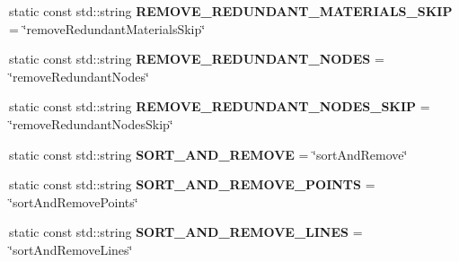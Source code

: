 \begin{DoxyCompactItemize}
\item 
\hypertarget{classrepo_1_1manipulator_1_1modelconvertor_1_1_model_import_config_a003b6e0a8d481f1306fc6880129f48cb}{}static const std\+::string {\bfseries R\+E\+M\+O\+V\+E\+\_\+\+R\+E\+D\+U\+N\+D\+A\+N\+T\+\_\+\+M\+A\+T\+E\+R\+I\+A\+L\+S\+\_\+\+S\+K\+I\+P} = \char`\"{}remove\+Redundant\+Materials\+Skip\char`\"{}\label{classrepo_1_1manipulator_1_1modelconvertor_1_1_model_import_config_a003b6e0a8d481f1306fc6880129f48cb}

\item 
\hypertarget{classrepo_1_1manipulator_1_1modelconvertor_1_1_model_import_config_afa1f8291118174a4f3c1d5043fda51c7}{}static const std\+::string {\bfseries R\+E\+M\+O\+V\+E\+\_\+\+R\+E\+D\+U\+N\+D\+A\+N\+T\+\_\+\+N\+O\+D\+E\+S} = \char`\"{}remove\+Redundant\+Nodes\char`\"{}\label{classrepo_1_1manipulator_1_1modelconvertor_1_1_model_import_config_afa1f8291118174a4f3c1d5043fda51c7}

\item 
\hypertarget{classrepo_1_1manipulator_1_1modelconvertor_1_1_model_import_config_a4a6b28358aa662917b2bb10f066ac468}{}static const std\+::string {\bfseries R\+E\+M\+O\+V\+E\+\_\+\+R\+E\+D\+U\+N\+D\+A\+N\+T\+\_\+\+N\+O\+D\+E\+S\+\_\+\+S\+K\+I\+P} = \char`\"{}remove\+Redundant\+Nodes\+Skip\char`\"{}\label{classrepo_1_1manipulator_1_1modelconvertor_1_1_model_import_config_a4a6b28358aa662917b2bb10f066ac468}

\item 
\hypertarget{classrepo_1_1manipulator_1_1modelconvertor_1_1_model_import_config_a888dc28ee93f04bb87050ae2d0c2eb2d}{}static const std\+::string {\bfseries S\+O\+R\+T\+\_\+\+A\+N\+D\+\_\+\+R\+E\+M\+O\+V\+E} = \char`\"{}sort\+And\+Remove\char`\"{}\label{classrepo_1_1manipulator_1_1modelconvertor_1_1_model_import_config_a888dc28ee93f04bb87050ae2d0c2eb2d}

\item 
\hypertarget{classrepo_1_1manipulator_1_1modelconvertor_1_1_model_import_config_a3b7ef0076d667ecf55cb862907e054b4}{}static const std\+::string {\bfseries S\+O\+R\+T\+\_\+\+A\+N\+D\+\_\+\+R\+E\+M\+O\+V\+E\+\_\+\+P\+O\+I\+N\+T\+S} = \char`\"{}sort\+And\+Remove\+Points\char`\"{}\label{classrepo_1_1manipulator_1_1modelconvertor_1_1_model_import_config_a3b7ef0076d667ecf55cb862907e054b4}

\item 
\hypertarget{classrepo_1_1manipulator_1_1modelconvertor_1_1_model_import_config_adb1e96658247b43fb8dd89933b16da1c}{}static const std\+::string {\bfseries S\+O\+R\+T\+\_\+\+A\+N\+D\+\_\+\+R\+E\+M\+O\+V\+E\+\_\+\+L\+I\+N\+E\+S} = \char`\"{}sort\+And\+Remove\+Lines\char`\"{}\label{classrepo_1_1manipulator_1_1modelconvertor_1_1_model_import_config_adb1e96658247b43fb8dd89933b16da1c}


\end{DoxyCompactItemize}
